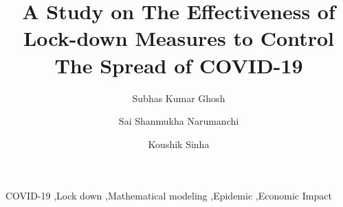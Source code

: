 \documentclass[preprint,authoryear,12pt]{elsarticle}
\begin{document}
	
	\begin{frontmatter}
		
		
		
		\title{A Study on The Effectiveness of Lock-down Measures to Control The Spread of COVID-19}
		
		
		\author[a1]{Subhas Kumar Ghosh}
		\author[a2]{Sai Shanmukha Narumanchi}
		\author[a2]{Koushik Sinha}
		
		\address[a1]{Commonwealth Bank of Australia, Sydney, New South Wales, 2000, Australia}
		\address[a2]{Department of Computer Science, Southern Illinois University, Carbondale, IL 62901, USA.}
		
		\begin{abstract}
			
		\end{abstract}
		
		\begin{keyword}
			COVID-19 \sep Lock down \sep Mathematical modeling \sep Epidemic \sep Economic Impact
			
			
		\end{keyword}
		
	\end{frontmatter}
	
\end{document}
